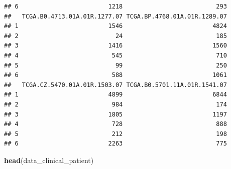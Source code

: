 \documentclass[
]{article}
\newenvironment{Shaded}{\begin{snugshade}}{\end{snugshade}}
\newcommand{\FunctionTok}[1]{\textcolor[rgb]{0.13,0.29,0.53}{\textbf{#1}}}
\newcommand{\NormalTok}[1]{#1}
\begin{document}
\begin{verbatim}
## 6                         1218                          293
##   TCGA.B0.4713.01A.01R.1277.07 TCGA.BP.4768.01A.01R.1289.07
## 1                         1546                         4824
## 2                           24                          185
## 3                         1416                         1560
## 4                          545                          710
## 5                           99                          250
## 6                          588                         1061
##   TCGA.CZ.5470.01A.01R.1503.07 TCGA.B0.5701.11A.01R.1541.07
## 1                         4899                         6844
## 2                          984                          174
## 3                         1805                         1197
## 4                          728                          888
## 5                          212                          198
## 6                         2263                          775
\end{verbatim}

\begin{Shaded}
\begin{Highlighting}[]
\FunctionTok{head}\NormalTok{(data\_clinical\_patient)}
\end{Highlighting}
\end{Shaded}
\end{document}
